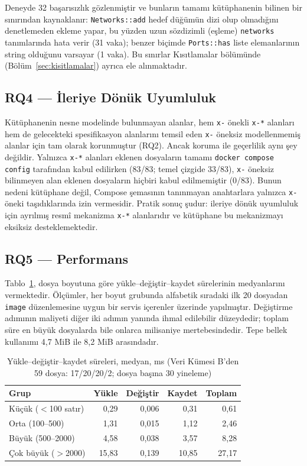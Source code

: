 \documentclass[conference]{IEEEtran}
\begin{document}
Deneyde 32 başarısızlık gözlenmiştir ve bunların tamamı kütüphanenin
bilinen bir sınırından kaynaklanır: \texttt{Networks::add} hedef düğümün
dizi olup olmadığını denetlemeden ekleme yapar, bu yüzden uzun sözdizimli
(eşleme) \texttt{networks} tanımlarında hata verir (31 vaka); benzer
biçimde \texttt{Ports::has} liste elemanlarının string olduğunu varsayar
(1 vaka). Bu sınırlar Kısıtlamalar bölümünde
(Bölüm~\ref{sec:kisitlamalar}) ayrıca ele alınmaktadır.

\subsection{RQ4 --- İleriye Dönük Uyumluluk}
Kütüphanenin nesne modelinde bulunmayan alanlar, hem \texttt{x-} önekli
\texttt{x-*} alanları hem de gelecekteki spesifikasyon alanlarını temsil eden
\texttt{x-} öneksiz modellenmemiş alanlar için tam olarak korunmuştur
(RQ2). Ancak koruma ile geçerlilik aynı şey değildir. Yalnızca
\texttt{x-*} alanları eklenen dosyaların tamamı
\texttt{docker compose config} tarafından kabul edilirken (83/83; temel
çizgide 33/83), \texttt{x-} öneksiz bilinmeyen alan eklenen dosyaların
hiçbiri kabul edilmemiştir (0/83). Bunun nedeni kütüphane değil, Compose
şemasının tanınmayan anahtarlara yalnızca \texttt{x-} öneki taşıdıklarında
izin vermesidir. Pratik sonuç şudur: ileriye dönük uyumluluk için ayrılmış
resmî mekanizma \texttt{x-*} alanlarıdır ve kütüphane bu mekanizmayı
eksiksiz desteklemektedir.

\subsection{RQ5 --- Performans}
Tablo~\ref{tab:perf}, dosya boyutuna göre yükle--değiştir--kaydet
sürelerinin medyanlarını vermektedir. Ölçümler, her boyut grubunda
alfabetik sıradaki ilk 20 dosyadan \texttt{image} düzenlemesine uygun bir
servis içerenler üzerinde yapılmıştır. Değiştirme adımının maliyeti diğer
iki adımın yanında ihmal edilebilir düzeydedir; toplam süre en büyük
dosyalarda bile onlarca milisaniye mertebesindedir. Tepe bellek kullanımı
4,7 MiB ile 8,2 MiB arasındadır.

\begin{table}[t]
\caption{Yükle--değiştir--kaydet süreleri, medyan, ms (Veri Kümesi B'den
59 dosya: 17/20/20/2; dosya başına 30 yineleme)}
\label{tab:perf}
\centering
\begin{tabular}{lrrrr}
\toprule
Grup & Yükle & Değiştir & Kaydet & Toplam \\
\midrule
Küçük ($<$100 satır) & 0,29 & 0,006 & 0,31 & 0,61 \\
Orta (100--500) & 1,31 & 0,015 & 1,12 & 2,46 \\
Büyük (500--2000) & 4,58 & 0,038 & 3,57 & 8,28 \\
Çok büyük ($>$2000) & 15,83 & 0,139 & 10,85 & 27,17 \\
\bottomrule
\end{tabular}
\end{table}
\end{document}

